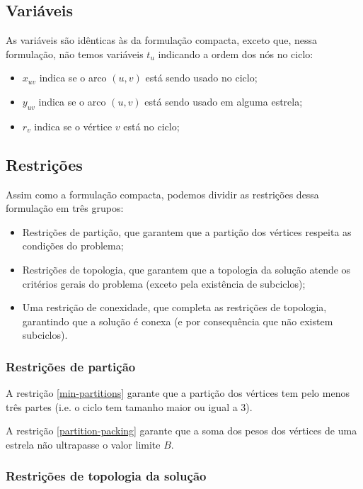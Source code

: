 \documentclass{article}
\begin{document}
\subsection{Variáveis}

As variáveis são idênticas às da formulação compacta, exceto que, nessa formulação, não temos variáveis $t_u$ indicando a ordem dos nós no ciclo:
\begin{itemize}
    \item $x_{uv}$ indica se o arco $(u, v)$ está sendo usado no ciclo;
    \item $y_{uv}$ indica se o arco $(u, v)$ está sendo usado em alguma estrela;
    \item $r_v$ indica se o vértice $v$ está no ciclo;
\end{itemize}

\subsection{Restrições}

Assim como a formulação compacta, podemos dividir as restrições dessa formulação em três grupos: 
\begin{itemize}
    \item Restrições de partição, que garantem que a partição dos vértices respeita as condições do problema;
    \item Restrições de topologia, que garantem que a topologia da solução atende os critérios gerais do problema (exceto pela existência de subciclos);
    \item Uma restrição de conexidade, que completa as restrições de topologia, garantindo que a solução é conexa (e por consequência que não existem subciclos).
\end{itemize}

\subsubsection{Restrições de partição}

A restrição \ref{min-partitions} garante que a partição dos vértices tem pelo menos três partes (i.e. o ciclo tem tamanho maior ou igual a 3).

A restrição \ref{partition-packing} garante que a soma dos pesos dos vértices de uma estrela não ultrapasse o valor limite $B$.

\subsubsection{Restrições de topologia da solução}
\end{document}
